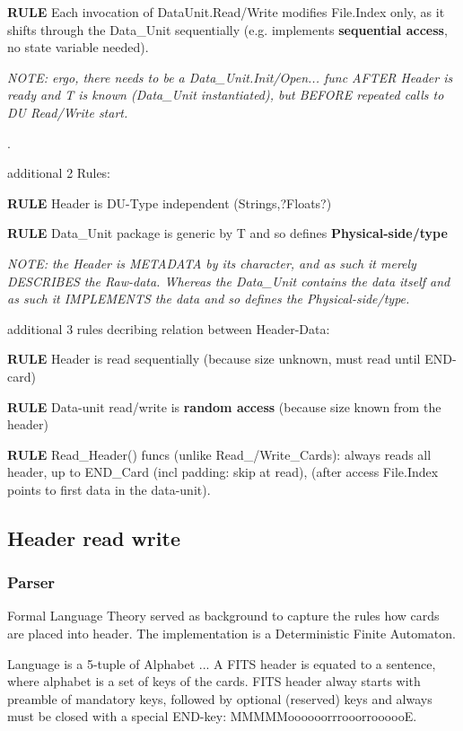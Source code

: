 \documentclass[a4paper,10pt]{article}
\begin{document}
\textbf{RULE} Each invocation of DataUnit.Read/Write modifies File.Index only, as it shifts through the Data\_Unit sequentially (e.g. implements \textbf{sequential access}, no state variable needed).

\textit{NOTE: ergo, there needs to be a Data\_Unit.Init/Open... func AFTER Header is ready and T is known (Data\_Unit instantiated), but BEFORE repeated calls to DU Read/Write start.}

.

additional 2 Rules:

\textbf{RULE} Header is DU-Type independent (Strings,?Floats?)

\textbf{RULE} Data\_Unit package is generic by T and so defines \textbf{Physical-side/type}

\textit{NOTE: the Header is METADATA by its character, and as such it merely DESCRIBES
the Raw-data. Whereas the Data\_Unit contains the data itself and as such it IMPLEMENTS
the data and so defines the Physical-side/type.}

additional 3 rules decribing relation between Header-Data:

\textbf{RULE} Header is read sequentially (because size unknown, must read until END-card)

\textbf{RULE} Data-unit read/write is \textbf{random access} (because size known from the header)

\textbf{RULE} Read\_Header() funcs (unlike Read\_/Write\_Cards):
always reads all header, up to END\_Card (incl padding: skip at read), (after access
File.Index points to first data in the data-unit).





\subsection{Header read write}

\subsubsection{Parser}

Formal Language Theory served as background to capture the rules how cards are placed 
into header. The implementation is a Deterministic Finite Automaton.

Language is a 5-tuple of Alphabet ...
A FITS header is equated to a sentence, where alphabet is a set of keys of the cards.
FITS header alway starts with preamble of mandatory keys, followed by optional (reserved) keys
and always must be closed with a special END-key: MMMMMoooooorrrooorroooooE.
\end{document}
